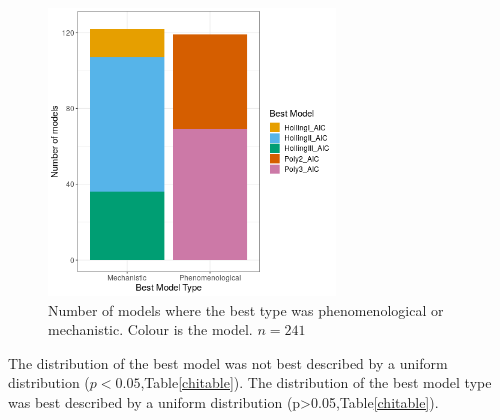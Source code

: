 \documentclass{article}
\begin{document}
\begin{figure}[h!] 
    \centering
    \includegraphics[width=3in]{../Results/Plots/modelbesttype.png}
    \caption{Number of models where the best type was phenomenological or mechanistic. Colour is the model. $n=241$}
    \label{fig:modelbesttype}
\end{figure}
The distribution of the best model was not best described by a uniform distribution ($p<0.05$,Table\ref{chitable}).  The distribution of the best model type was best described by a uniform distribution (p>0.05,Table\ref{chitable}).

\end{document}
